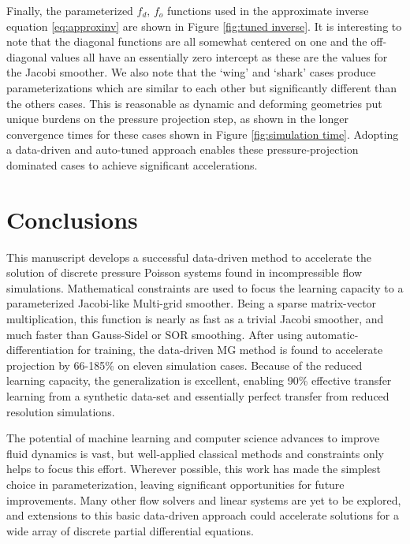 \documentclass[review]{elsarticle}
\begin{document}
Finally, the parameterized $f_d,\,f_o$ functions used in the approximate inverse equation \ref{eq:approxinv} are shown in Figure \ref{fig:tuned inverse}. It is interesting to note that the diagonal functions are all somewhat centered on one and the off-diagonal values all have an essentially zero intercept as these are the values for the Jacobi smoother. We also note that the `wing' and `shark' cases produce parameterizations which are similar to each other but significantly different than the others cases. This is reasonable as dynamic and deforming geometries put unique burdens on the pressure projection step, as shown in the longer convergence times for these cases shown in Figure \ref{fig:simulation time}. Adopting a data-driven and auto-tuned approach enables these pressure-projection dominated cases to achieve significant accelerations.

\section{Conclusions}

This manuscript develops a successful data-driven method to accelerate the solution of discrete pressure Poisson systems found in incompressible flow simulations. Mathematical constraints are used to focus the learning capacity to a parameterized Jacobi-like Multi-grid smoother. Being a sparse matrix-vector multiplication, this function is nearly as fast as a trivial Jacobi smoother, and much faster than Gauss-Sidel or SOR smoothing. After using automatic-differentiation for training, the data-driven MG method is found to accelerate projection by 66-185\% on eleven simulation cases. Because of the reduced learning capacity, the generalization is excellent, enabling 90\% effective transfer learning from a synthetic data-set and essentially perfect transfer from reduced resolution simulations. 

The potential of machine learning and computer science advances to improve fluid dynamics is vast, but well-applied classical methods and constraints only helps to focus this effort. Wherever possible, this work has made the simplest choice in parameterization, leaving significant opportunities for future improvements. Many other flow solvers and linear systems are yet to be explored, and extensions to this basic data-driven approach could accelerate solutions for a wide array of discrete partial differential equations. 



\end{document}
